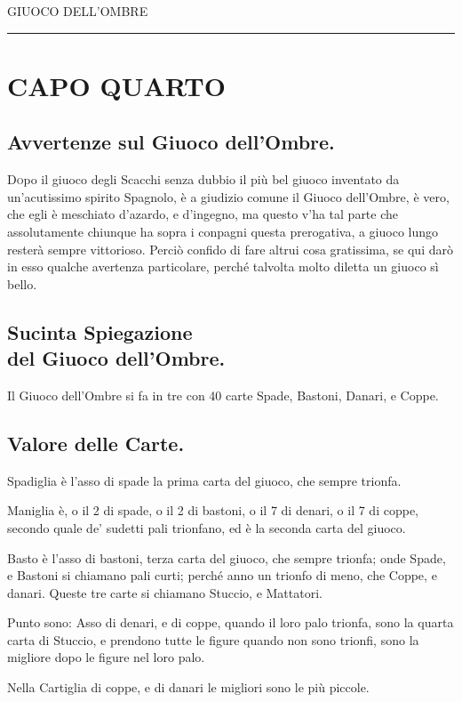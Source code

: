 \documentclass[11pt,a6paper]{article}
\newcommand{\supersection}[1]{%
\clearpage
    {\scshape \centering \huge #1\\}
    \vspace{6pt}
    \hrule
    \vspace{12pt}
}
\begin{document}
\supersection{GIUOCO DELL'OMBRE}

\section{CAPO QUARTO}

\subsection{Avvertenze sul Giuoco dell'Ombre.}

\lettrine{D}opo il giuoco degli Scacchi senza
dubbio il più bel giuoco inventato da un'acutissimo
spirito Spagnolo, è a giudizio
comune il Giuoco dell'Ombre, è vero,
che egli è meschiato d'azardo, e d'ingegno,
ma questo v'ha tal parte che assolutamente
chiunque ha sopra i conpagni questa
prerogativa, a giuoco lungo resterà sempre
vittorioso. Perciò confido di fare altrui cosa
gratissima, se qui darò in esso qualche avertenza
particolare, perché talvolta molto diletta
un giuoco sì bello.

\subsection{Sucinta Spiegazione \\del Giuoco
dell'Ombre.}

Il Giuoco dell'Ombre si fa in tre con 40
carte Spade, Bastoni, Danari, e Coppe.

\subsection{Valore delle Carte.}

Spadiglia è l'asso di spade la prima carta
del giuoco, che sempre trionfa.

Maniglia è, o il 2 di spade, o il 2 di bastoni,
o il 7 di denari, o il 7 di coppe, secondo quale
de' sudetti pali trionfano, ed è la seconda carta del giuoco.

Basto è l'asso di bastoni, terza carta del giuoco,
che sempre trionfa; onde Spade, e Bastoni
si chiamano pali curti; perché anno un
trionfo di meno, che Coppe, e danari. Queste
tre carte si chiamano Stuccio, e Mattatori.

Punto sono: Asso di denari, e di coppe,
quando il loro palo trionfa, sono la quarta
carta di Stuccio, e prendono tutte le figure
quando non sono trionfi, sono la migliore
dopo le figure nel loro palo.

Nella Cartiglia di coppe, e di danari le
migliori sono le più piccole.
\end{document}
